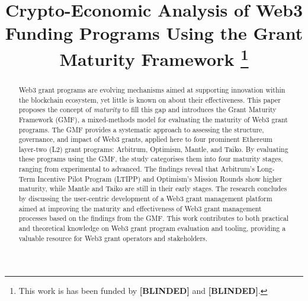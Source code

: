 \documentclass[conference]{IEEEtran}
\begin{document}
\title{Crypto-Economic Analysis of Web3 Funding Programs Using the Grant Maturity Framework
\thanks{This work is has been funded by \textbf{[BLINDED]} and \textbf{[BLINDED]}.}
}
\author{

\and
{}

\and
{}
}
\maketitle

\begin{abstract}
Web3 grant programs are evolving mechanisms aimed at supporting innovation within the blockchain ecosystem, yet little is known on about their effectiveness. This paper proposes the concept of \textit{maturity} to fill this gap and introduces the Grant Maturity Framework (GMF), a mixed-methods model for evaluating the maturity of Web3 grant programs. The GMF provides a systematic approach to assessing the structure, governance, and impact of Web3 grants, applied here to four prominent Ethereum layer-two (L2) grant programs: Arbitrum, Optimism, Mantle, and Taiko. By evaluating these programs using the GMF, the study categorises them into four maturity stages, ranging from experimental to advanced. The findings reveal that Arbitrum's Long-Term Incentive Pilot Program (LTIPP) and Optimism's Mission Rounds show higher maturity, while Mantle and Taiko are still in their early stages. The research concludes by discussing the user-centric development of a Web3 grant management platform aimed at improving the maturity and effectiveness of Web3 grant management processes based on the findings from the GMF. This work contributes to both practical and theoretical knowledge on Web3 grant program evaluation and tooling, providing a valuable resource for Web3 grant operators and stakeholders.
\end{abstract}
\end{document}
